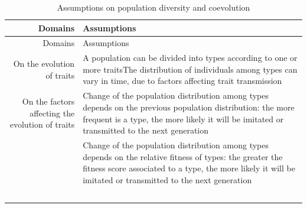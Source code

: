 \documentclass[
]{book}
\begin{document}
\begin{longtable}[]{@{}rl@{}}
\caption{Assumptions on population diversity and coevolution}\tabularnewline
\toprule
\begin{minipage}[b]{0.45\columnwidth}\raggedleft
Domains\strut
\end{minipage} & \begin{minipage}[b]{0.49\columnwidth}\raggedright
Assumptions\strut
\end{minipage}\tabularnewline
\midrule
\endfirsthead
\toprule
\begin{minipage}[b]{0.45\columnwidth}\raggedleft
Domains\strut
\end{minipage} & \begin{minipage}[b]{0.49\columnwidth}\raggedright
Assumptions\strut
\end{minipage}\tabularnewline
\midrule
\endhead
\begin{minipage}[t]{0.45\columnwidth}\raggedleft
On the evolution of traits\strut
\end{minipage} & \begin{minipage}[t]{0.49\columnwidth}\raggedright
A population can be divided into types according to one or more traitsThe distribution of individuals among types can vary in time, due to factors affecting trait transmission\strut
\end{minipage}\tabularnewline
\begin{minipage}[t]{0.45\columnwidth}\raggedleft
On the factors affecting the evolution of traits\strut
\end{minipage} & \begin{minipage}[t]{0.49\columnwidth}\raggedright
Change of the population distribution among types depends on the previous population distribution: the more frequent is a type, the more likely it will be imitated or transmitted to the next generation\strut
\end{minipage}\tabularnewline
\begin{minipage}[t]{0.45\columnwidth}\raggedleft
﻿\strut
\end{minipage} & \begin{minipage}[t]{0.49\columnwidth}\raggedright
Change of the population distribution among types depends on the relative fitness of types: the greater the fitness score associated to a type, the more likely it will be imitated or transmitted to the next generation\strut
\end{minipage}\tabularnewline
\begin{minipage}[t]{0.45\columnwidth}\raggedleft
﻿\strut

\end{minipage}
\end{longtable}
\end{document}
